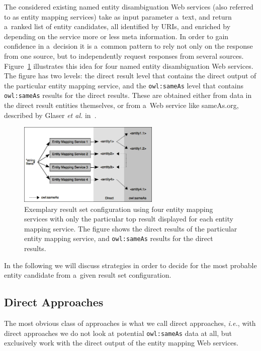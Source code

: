 The considered existing named entity disambiguation Web services (also referred to as entity mapping services) take as input parameter a~text, and return a~ranked list of entity
candidates, all identified by URIs, and enriched by depending on the service more or less meta information. In order to
gain confidence in a~decision it is a~common pattern to rely not only on the response from one source, but to
independently request responses from several sources. Figure~\ref{fig:diagram} illustrates this idea for four named entity disambiguation Web services. The figure has two levels: the direct result level that contains the direct output of the 
particular entity mapping service, and the \texttt{owl:sameAs} level that contains \texttt{owl:sameAs} results for the
direct results. These are obtained either from data in the direct result entities themselves, or from a~Web service
like sameAs.org, described by Glaser \emph{et al.} in~\cite{Glaser:SameAs}.

\begin{figure}
 \centering
 \includegraphics[width=0.6\textwidth]{diagram.png}
 \caption{Exemplary result set configuration using four entity mapping services with only the particular top result displayed for each entity mapping service. The figure shows the direct results of the particular entity mapping service, and \texttt{owl:sameAs} results for the direct results.}
 \label{fig:diagram}
\end{figure}

In the following we will discuss strategies in order to decide for the most probable entity candidate from a~given
result set configuration.

\subsection{Direct Approaches}
The most obvious class of approaches is what we call direct approaches, \emph{i.e.}, with direct approaches we do not look at potential \texttt{owl:sameAs} data at all, but exclusively work with the direct output of the entity mapping Web services.

